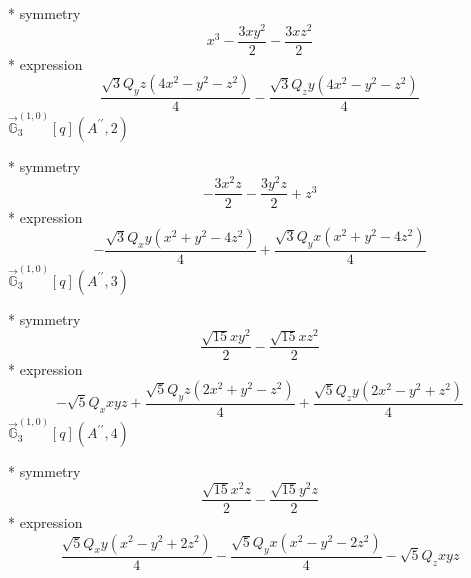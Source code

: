 \documentclass[fleqn,8pt]{jsarticle}
\begin{document}
\noindent\quad ** symmetry
\begin{dmath*}
x^{3} - \frac{3 x y^{2}}{2} - \frac{3 x z^{2}}{2}
\end{dmath*}
\noindent\quad ** expression
\begin{dmath*}
\frac{\sqrt{3} Q_{y} z \left(4 x^{2} - y^{2} - z^{2}\right)}{4} - \frac{\sqrt{3} Q_{z} y \left(4 x^{2} - y^{2} - z^{2}\right)}{4}
\end{dmath*}
\noindent\quad $\vec{\mathbb{G}}_{3}^{(1,0)}[q](A^{\prime\prime},2)$

\noindent\quad ** symmetry
\begin{dmath*}
- \frac{3 x^{2} z}{2} - \frac{3 y^{2} z}{2} + z^{3}
\end{dmath*}
\noindent\quad ** expression
\begin{dmath*}
- \frac{\sqrt{3} Q_{x} y \left(x^{2} + y^{2} - 4 z^{2}\right)}{4} + \frac{\sqrt{3} Q_{y} x \left(x^{2} + y^{2} - 4 z^{2}\right)}{4}
\end{dmath*}
\noindent\quad $\vec{\mathbb{G}}_{3}^{(1,0)}[q](A^{\prime\prime},3)$

\noindent\quad ** symmetry
\begin{dmath*}
\frac{\sqrt{15} x y^{2}}{2} - \frac{\sqrt{15} x z^{2}}{2}
\end{dmath*}
\noindent\quad ** expression
\begin{dmath*}
- \sqrt{5} Q_{x} x y z + \frac{\sqrt{5} Q_{y} z \left(2 x^{2} + y^{2} - z^{2}\right)}{4} + \frac{\sqrt{5} Q_{z} y \left(2 x^{2} - y^{2} + z^{2}\right)}{4}
\end{dmath*}
\noindent\quad $\vec{\mathbb{G}}_{3}^{(1,0)}[q](A^{\prime\prime},4)$

\noindent\quad ** symmetry
\begin{dmath*}
\frac{\sqrt{15} x^{2} z}{2} - \frac{\sqrt{15} y^{2} z}{2}
\end{dmath*}
\noindent\quad ** expression
\begin{dmath*}
\frac{\sqrt{5} Q_{x} y \left(x^{2} - y^{2} + 2 z^{2}\right)}{4} - \frac{\sqrt{5} Q_{y} x \left(x^{2} - y^{2} - 2 z^{2}\right)}{4} - \sqrt{5} Q_{z} x y z
\end{dmath*}
\end{document}

